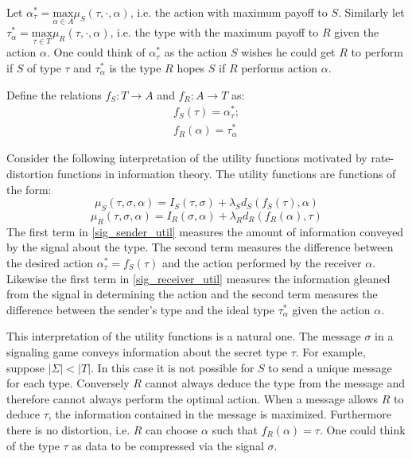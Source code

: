 \documentclass{article}
\begin{document}
\noindent Let $\alpha_\tau^* = \underset{\alpha \in A}{\text{max}} \mu_S(\tau, \cdot, \alpha)$, i.e. the action with maximum payoff to $S$. Similarly let $\tau_\alpha^* = \underset{\tau \in T}{\text{max}} \mu_R(\tau, \cdot, \alpha)$, i.e. the type with the maximum payoff to $R$ given the action $\alpha$. One could think of $\alpha_\tau^*$ as the action $S$ wishes he could get $R$ to perform if $S$ of type $\tau$ and $\tau_\alpha^*$ is the type $R$ hopes $S$ if $R$ performs action $\alpha$.

Define the relations $f_S: T \rightarrow A$ and $f_R: A \rightarrow T$ as:
\begin{align*}
    f_S(\tau) = \alpha_\tau^*;\\
    f_R(\alpha) = \tau_\alpha^*
\end{align*}

Consider the following interpretation of the utility functions motivated by rate-distortion functions in information theory.  The utility functions are functions of the form:
\begin{equation}
    \mu_S(\tau, \sigma, \alpha) = I_S(\tau, \sigma) + \lambda_S d_S(f_S(\tau), \alpha)
\label{sig_sender_util}
\end{equation}\begin{equation}
    \mu_R(\tau, \sigma, \alpha) = I_R(\sigma, \alpha) + \lambda_R d_R(f_R(\alpha), \tau)
\label{sig_receiver_util}
\end{equation}
\noindent The first term in \autoref{sig_sender_util} measures the amount of information conveyed by the signal about the type. The second term measures the difference between the desired action $\alpha_\tau^* = f_S(\tau)$ and the action performed by the receiver $\alpha$. Likewise the first term in \autoref{sig_receiver_util} measures the information gleaned from the signal in determining the action and the second term measures the difference between the sender's type and the ideal type $\tau_\alpha^*$ given the action $\alpha$.

This interpretation of the utility functions is a natural one. The message $\sigma$ in a signaling game conveys information about the secret type $\tau$. For example, suppose $\vert \Sigma \vert < \vert T \vert$. In this case it is not possible for $S$ to send a unique message for each type. Conversely $R$ cannot always deduce the type from the message and therefore cannot always perform the optimal action. When a message allows $R$ to deduce $\tau$, the information contained in the message is maximized. Furthermore there is no distortion, i.e. $R$ can choose $\alpha$ such that $f_R(\alpha) = \tau$. One could think of the type $\tau$ as data to be compressed via the signal $\sigma$.
\end{document}
